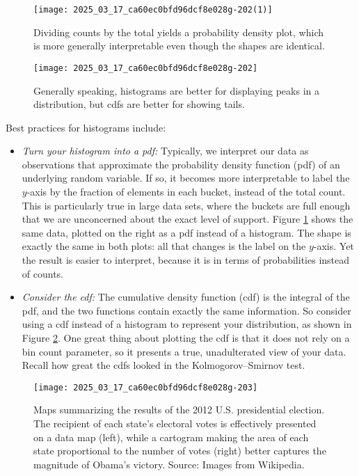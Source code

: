 \documentclass[10pt]{article}
\begin{document}
\begin{figure}[H]
    \centering
    \texttt{[image: 2025\_03\_17\_ca60ec0bfd96dcf8e028g-202(1)]}
    \caption{Dividing counts by the total yields a probability density plot, which is more generally interpretable even though the shapes are identical.}
    \label{fig:probability-density-plot}
\end{figure}

\begin{figure}[H]
    \centering
    \texttt{[image: 2025\_03\_17\_ca60ec0bfd96dcf8e028g-202]}
    \caption{Generally speaking, histograms are better for displaying peaks in a distribution, but cdfs are better for showing tails.}
    \label{fig:cdfs-vs-histograms}
\end{figure}

Best practices for histograms include:

\begin{itemize}
    \item \textit{Turn your histogram into a pdf:} Typically, we interpret our data as observations that approximate the probability density function (pdf) of an underlying random variable. If so, it becomes more interpretable to label the $y$-axis by the fraction of elements in each bucket, instead of the total count. This is particularly true in large data sets, where the buckets are full enough that we are unconcerned about the exact level of support. Figure \ref{fig:probability-density-plot} shows the same data, plotted on the right as a pdf instead of a histogram. The shape is exactly the same in both plots: all that changes is the label on the $y$-axis. Yet the result is easier to interpret, because it is in terms of probabilities instead of counts.
    \item \textit{Consider the cdf:} The cumulative density function (cdf) is the integral of the pdf, and the two functions contain exactly the same information. So consider using a cdf instead of a histogram to represent your distribution, as shown in Figure \ref{fig:cdfs-vs-histograms}. One great thing about plotting the cdf is that it does not rely on a bin count parameter, so it presents a true, unadulterated view of your data. Recall how great the cdfs looked in the Kolmogorov–Smirnov test. 
\end{itemize}

\begin{figure}[H]
    \centering
    \texttt{[image: 2025\_03\_17\_ca60ec0bfd96dcf8e028g-203]}
    \caption{Maps summarizing the results of the 2012 U.S. presidential election. The recipient of each state's electoral votes is effectively presented on a data map (left), while a cartogram making the area of each state proportional to the number of votes (right) better captures the magnitude of Obama's victory. Source: Images from Wikipedia.}
    \label{fig:maps-us-presidential-election}
\end{figure}
\end{document}
